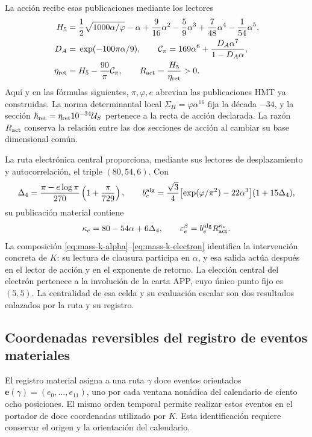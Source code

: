 \documentclass[a4paper,10pt]{article}
\theoremstyle{definition}\newtheorem{definition}[theorem]{Definición}
\theoremstyle{remark}\newtheorem{remark}[theorem]{Observación}
\numberwithin{equation}{section}
\begin{document}
La acción recibe esas publicaciones mediante los lectores
\begin{align}
 H_5={}&\frac12\sqrt{1000\alpha/\varphi}-\alpha+
       \frac9{16}\alpha^2-\frac59\alpha^3+
       \frac7{48}\alpha^4-\frac1{54}\alpha^5,\notag\\
 D_A={}&\exp(-100\pi\alpha/9),\qquad
 \mathcal C_\pi=169\alpha^6+\frac{D_A\alpha^7}{1-D_A\alpha},\notag\\
 \eta_{\rm ret}={}&H_5-\frac{90}{\pi}\mathcal C_\pi,
 \qquad R_{\rm act}=\frac{H_5}{\eta_{\rm ret}}>0.
 \label{eq:mass-k-action}
\end{align}
Aquí y en las fórmulas siguientes, \(\pi,\varphi,e\) abrevian las
publicaciones HMT ya construidas. La norma determinantal local
\(\Sigma_H=\varphi\alpha^{16}\) fija la década \(-34\), y la
sección \(\hbar_{\rm ret}=\eta_{\rm ret}10^{-34}\mathcal U_S\)
pertenece a la recta de acción declarada. La razón \(R_{\rm act}\)
conserva la relación entre las dos secciones de acción al cambiar su base
dimensional común.

La ruta electrónica central proporciona, mediante sus lectores de
desplazamiento y autocorrelación, el triple \((80,54,6)\). Con
\[
 \Delta_4=\frac{\pi-e\log\pi}{270}\left(1+\frac\pi{729}\right),
 \qquad
 b_e^{\rm alg}=\frac{\sqrt3}{4}
       \bigl[\exp(\varphi/\pi^2)-22\alpha^3\bigr](1+15\Delta_4),
\]
su publicación material contiene
\begin{equation}
 \kappa_e=80-54\alpha+6\Delta_4,
 \qquad \varepsilon_e^\beta=b_e^{\rm alg}R_{\rm act}^{\kappa_e}.
 \label{eq:mass-k-electron}
\end{equation}
La composición \eqref{eq:mass-k-alpha}--\eqref{eq:mass-k-electron}
identifica la intervención concreta de \(K\): su lectura de clausura
participa en \(\alpha\), y esa salida actúa después en el lector de
acción y en el exponente de retorno. La elección central del electrón
pertenece a la involución de la carta APP, cuyo único punto fijo es
\((5,5)\). La centralidad de esa celda y su evaluación escalar son
dos resultados enlazados por la ruta y su registro.

\subsection{Coordenadas reversibles del registro de eventos materiales}

El registro material asigna a una ruta \(\gamma\) doce eventos
orientados \(\mathbf e(\gamma)=(e_0,\ldots,e_{11})\), uno por cada
ventana nonádica del calendario de ciento ocho posiciones. El mismo
orden temporal permite realizar estos eventos en el portador de doce
coordenadas utilizado por \(K\). Esta identificación requiere conservar
el origen y la orientación del calendario.
\end{document}
